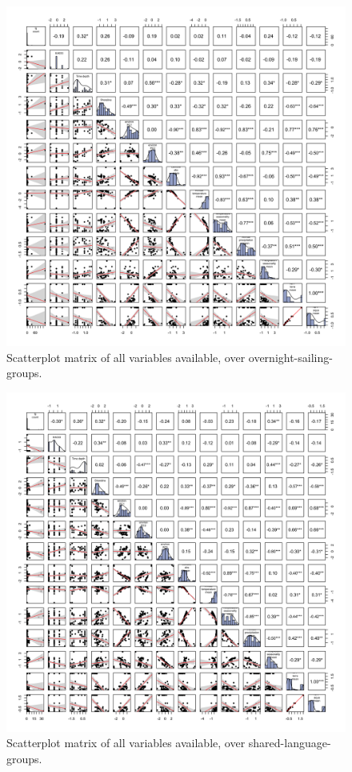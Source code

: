 \documentclass[unnumsec,webpdf,modern,medium]{oup-authoring-template}
\begin{document}
\begin{appendices}
\begin{figure}[ht]
\includegraphics[width=\textwidth]{latex/SPLOM_SBZR_all_variables.png}
\caption{Scatterplot matrix of all variables available, over overnight-sailing-groups.}
\label{SPLOM_SBZR_all_variables}
\end{figure}

\begin{figure}[ht]
\includegraphics[width=\textwidth]{latex/SPLOM_medium_all_variables.png}
\caption{Scatterplot matrix of all variables available, over shared-language-groups.}
\label{SPLOM_medium_all_variables}
\end{figure}




\end{appendices}
\end{document}
